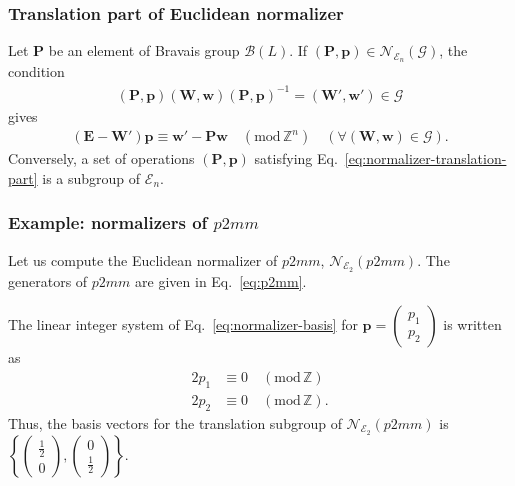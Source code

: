 \subsubsection{Translation part of Euclidean normalizer}

Let $\bm{P}$ be an element of Bravais group $\mathcal{B}(L)$.
If $(\bm{P}, \bm{p} ) \in \mathcal{N}_{\mathcal{E}_{n}}(\mathcal{G})$, the condition
\begin{align}
  (\bm{P}, \bm{p}) (\bm{W}, \bm{w}) (\bm{P}, \bm{p})^{-1} = (\bm{W}', \bm{w}') \in \mathcal{G}
\end{align}
gives
\begin{align}
    \label{eq:normalizer-translation-part}
    (\bm{E} - \bm{W}' ) \bm{p} \equiv \bm{w}' - \bm{Pw} \quad (\mathrm{mod}\, \mathbb{Z}^{n})
    \quad (\forall ( \bm{W}, \bm{w} ) \in \mathcal{G} ).
\end{align}
Conversely, a set of operations $(\bm{P}, \bm{p})$ satisfying Eq.~\eqref{eq:normalizer-translation-part} is a subgroup of $\mathcal{E}_{n}$.

\subsubsection{\label{sec:normalizer-example-p2mm}Example: normalizers of \texorpdfstring{$p2mm$}{p2mm}}

Let us compute the Euclidean normalizer of $p2mm$, $\mathcal{N}_{\mathcal{E}_{2}}(p2mm)$.
The generators of $p2mm$ are given in Eq.~\eqref{eq:p2mm}.

The linear integer system of Eq.~\eqref{eq:normalizer-basis} for $\bm{p} = \begin{pmatrix} p_{1} \\ p_{2} \end{pmatrix}$ is written as
\begin{align*}
  2 p_{1} &\equiv 0 \quad (\mathrm{mod} \, \mathbb{Z}) \\
  2 p_{2} &\equiv 0 \quad (\mathrm{mod} \, \mathbb{Z}).
\end{align*}
Thus, the basis vectors for the translation subgroup of $\mathcal{N}_{\mathcal{E}_{2}}(p2mm)$ is
$\left\{ \begin{pmatrix} \frac{1}{2} \\ 0 \end{pmatrix}, \begin{pmatrix} 0 \\ \frac{1}{2} \end{pmatrix} \right\}$.

